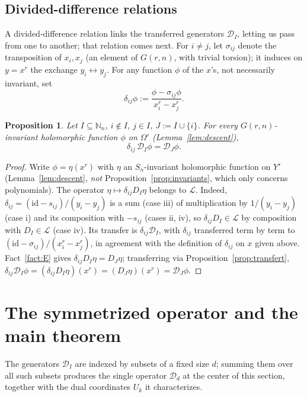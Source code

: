 \documentclass[10pt,a4paper]{amsart}
\newtheorem{proposition}[theorem]{Proposition}
\newcommand{\NN}{\mathbb{N}}
\begin{document}
\subsection{Divided-difference relations}

A divided-difference relation links the transferred generators $\mathcal D_I$, letting us pass from one to another; that relation comes next. For $i\neq j$, let $\sigma_{ij}$ denote the transposition of $x_i,x_j$ (an element of $G(r,n)$, with trivial torsion); it induces on $y=x^r$ the exchange $y_i\leftrightarrow y_j$. For any function $\phi$ of the $x$'s, not necessarily invariant, set
\[
\delta_{ij}\phi := \frac{\phi - \sigma_{ij}\phi}{x_i^r - x_j^r}.
\]

\begin{proposition}\label{prop:prop5}
Let $I\subseteq\NN_n$, $i\notin I$, $j\in I$, $J:=I\cup\{i\}$. For every $G(r,n)$-invariant holomorphic function $\phi$ on $\Omega'$ (Lemma~\ref{lem:descent}),
\[
\delta_{ij}\,\mathcal D_I\phi = \mathcal D_J\phi .
\]
\end{proposition}

\begin{proof}
Write $\phi=\eta(x^r)$ with $\eta$ an $S_n$-invariant holomorphic function on $Y'$ (Lemma~\ref{lem:descent}, \emph{not} Proposition~\ref{prop:invariants}, which only concerns polynomials). The operator $\eta\mapsto \delta_{ij}D_I\eta$ belongs to $\mathcal L$. Indeed, $\delta_{ij}=(\mathrm{id}-s_{ij})/(y_i-y_j)$ is a sum (case iii) of multiplication by $1/(y_i-y_j)$ (case i) and its composition with $-s_{ij}$ (cases ii, iv), so $\delta_{ij}D_I\in\mathcal L$ by composition with $D_I\in\mathcal L$ (case iv). Its transfer is $\delta_{ij}\mathcal D_I$, with $\delta_{ij}$ transferred term by term to $(\mathrm{id}-\sigma_{ij})/(x_i^r-x_j^r)$, in agreement with the definition of $\delta_{ij}$ on $x$ given above. Fact~\ref{fact:E} gives $\delta_{ij}D_I\eta=D_J\eta$; transferring via Proposition~\ref{prop:transfert}, $\delta_{ij}\mathcal D_I\phi = (\delta_{ij}D_I\eta)(x^r) = (D_J\eta)(x^r) = \mathcal D_J\phi$.
\end{proof}

\section{The symmetrized operator and the main theorem}

The generators $\mathcal D_I$ are indexed by subsets of a fixed size $d$; summing them over all such subsets produces the single operator $\mathcal D_d$ at the center of this section, together with the dual coordinates $U_k$ it characterizes.
\end{document}
